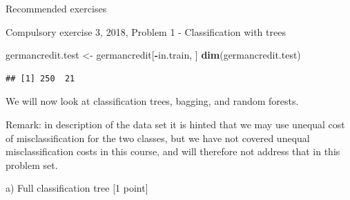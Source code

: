\documentclass[ignorenonframetext,]{beamer}
\newenvironment{Shaded}{\begin{snugshade}}{\end{snugshade}}
\newcommand{\KeywordTok}[1]{\textcolor[rgb]{0.13,0.29,0.53}{\textbf{#1}}}
\newcommand{\DataTypeTok}[1]{\textcolor[rgb]{0.13,0.29,0.53}{#1}}
\newcommand{\DecValTok}[1]{\textcolor[rgb]{0.00,0.00,0.81}{#1}}
\newcommand{\StringTok}[1]{\textcolor[rgb]{0.31,0.60,0.02}{#1}}
\newcommand{\CommentTok}[1]{\textcolor[rgb]{0.56,0.35,0.01}{\textit{#1}}}
\newcommand{\OperatorTok}[1]{\textcolor[rgb]{0.81,0.36,0.00}{\textbf{#1}}}
\newcommand{\NormalTok}[1]{#1}
\begin{document}
\begin{frame}[fragile]{Recommended exercises}
\begin{block}{Compulsory exercise 3, 2018, Problem 1 - Classification
with trees}
\begin{Shaded}
\begin{Highlighting}[]
\NormalTok{germancredit.test <-}\StringTok{ }\NormalTok{germancredit[}\OperatorTok{-}\NormalTok{in.train, ]}
\KeywordTok{dim}\NormalTok{(germancredit.test)}
\end{Highlighting}
\end{Shaded}

\begin{verbatim}
## [1] 250  21
\end{verbatim}

We will now look at classification trees, bagging, and random forests.

Remark: in description of the data set it is hinted that we may use
unequal cost of misclassification for the two classes, but we have not
covered unequal misclassification costs in this course, and will
therefore not address that in this problem set.

\begin{block}{a) Full classification tree {[}1 point{]}}

\begin{Shaded}
\end{Shaded}


\end{block}
\end{block}
\end{frame}
\end{document}
